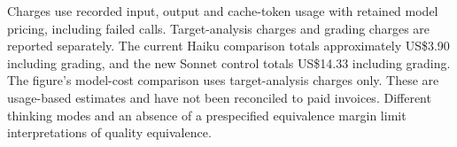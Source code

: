 Charges use recorded input, output and cache-token usage with retained model pricing, including failed calls. Target-analysis charges and grading charges are reported separately. The current Haiku comparison totals approximately US\$3.90 including grading, and the new Sonnet control totals US\$14.33 including grading. The figure's model-cost comparison uses target-analysis charges only. These are usage-based estimates and have not been reconciled to paid invoices. Different thinking modes and an absence of a prespecified equivalence margin limit interpretations of quality equivalence.
